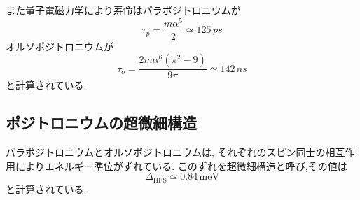 また量子電磁力学により寿命はパラポジトロニウムが
\begin{equation}
	\nonumber
\tau_{p} = \frac{m \alpha^{5}}{2} \simeq 125 \, \si{ps}
\end{equation}
オルソポジトロニウムが
\begin{equation}
	\nonumber
\tau_{o} = \frac{2m \alpha^{6}(\pi^{2}-9)}{9 \pi} \simeq 142 \, \si{ns}
\end{equation}
と計算されている.


\subsection{ポジトロニウムの超微細構造}

パラポジトロニウムとオルソポジトロニウムは,
それぞれのスピン同士の相互作用によりエネルギー準位がずれている.
このずれを超微細構造と呼び,その値は
\begin{equation}
	\nonumber
\Delta_{\mathrm{HFS}} \simeq 0.84 \, \mathrm{meV}
\end{equation}
と計算されている.


